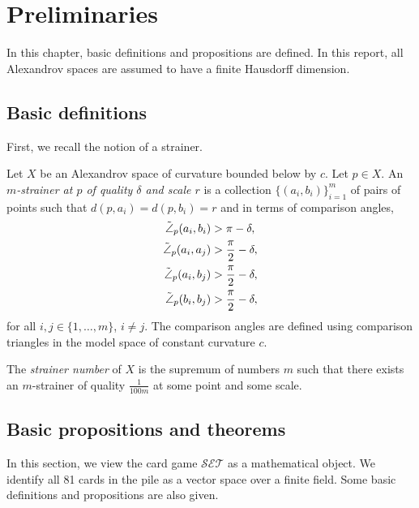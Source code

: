 \documentclass[ma493]{swumath}
\begin{document}
\chapter{Preliminaries}
In this chapter, basic definitions and propositions are defined. In this report, all Alexandrov spaces are assumed to have a finite Hausdorff dimension.
 
\section{Basic definitions} 
First, we recall the notion of a strainer.
\begin{definition}
Let $X$ be an Alexandrov space of curvature bounded below by $c$. Let $p \in X$.
An \emph{$m$-strainer at $p$ of quality $\delta$ and scale $r$} is a collection $\{(a_i, b_i)\}_{i=1}^m$ 
of pairs of points such that $d(p,a_i) = d(p, b_i) = r$ and in terms of comparison angles,
\begin{align}
\tilde{\angle}_p(a_i, b_i) & > \pi - \delta, \\
\tilde{\angle}_p(a_i, a_j) & > \frac{\pi}{2} - \delta, \notag \\
\tilde{\angle}_p(a_i, b_j) & > \frac{\pi}{2} - \delta, \notag \\
\tilde{\angle}_p(b_i, b_j) & > \frac{\pi}{2} - \delta, \notag 
\end{align}
for all $i,j \in \{1, \ldots, m\}$, $i \neq j$.
The comparison angles are defined using comparison triangles in the model space of constant curvature $c$.
\end{definition}

\begin{definition}
The \emph{strainer number} of $X$ is the supremum of numbers $m$ such that there exists an $m$-strainer of quality $\frac{1}{100m}$ at some point and some scale.
\end{definition}
 
\section{Basic propositions and theorems}
In this section, we view the card game $\mathcal{SET}$ as a mathematical object. We identify all 81 cards in the pile as a vector space over a finite field. Some basic definitions and propositions are also given.
\end{document}
